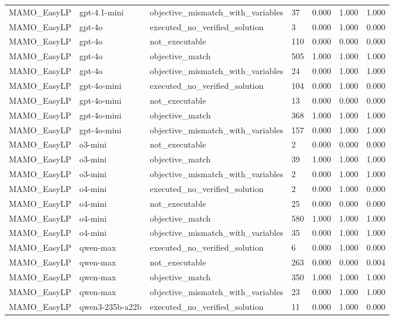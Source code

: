 \begin{table}[t]
\begin{tabular}{lllllll}
MAMO\_EasyLP & gpt-4.1-mini & objective\_mismatch\_with\_variables & 37 & 0.000 & 1.000 & 1.000 \\
MAMO\_EasyLP & gpt-4o & executed\_no\_verified\_solution & 3 & 0.000 & 1.000 & 0.000 \\
MAMO\_EasyLP & gpt-4o & not\_executable & 110 & 0.000 & 0.000 & 0.000 \\
MAMO\_EasyLP & gpt-4o & objective\_match & 505 & 1.000 & 1.000 & 1.000 \\
MAMO\_EasyLP & gpt-4o & objective\_mismatch\_with\_variables & 24 & 0.000 & 1.000 & 1.000 \\
MAMO\_EasyLP & gpt-4o-mini & executed\_no\_verified\_solution & 104 & 0.000 & 1.000 & 0.000 \\
MAMO\_EasyLP & gpt-4o-mini & not\_executable & 13 & 0.000 & 0.000 & 0.000 \\
MAMO\_EasyLP & gpt-4o-mini & objective\_match & 368 & 1.000 & 1.000 & 1.000 \\
MAMO\_EasyLP & gpt-4o-mini & objective\_mismatch\_with\_variables & 157 & 0.000 & 1.000 & 1.000 \\
MAMO\_EasyLP & o3-mini & not\_executable & 2 & 0.000 & 0.000 & 0.000 \\
MAMO\_EasyLP & o3-mini & objective\_match & 39 & 1.000 & 1.000 & 1.000 \\
MAMO\_EasyLP & o3-mini & objective\_mismatch\_with\_variables & 2 & 0.000 & 1.000 & 1.000 \\
MAMO\_EasyLP & o4-mini & executed\_no\_verified\_solution & 2 & 0.000 & 1.000 & 0.000 \\
MAMO\_EasyLP & o4-mini & not\_executable & 25 & 0.000 & 0.000 & 0.000 \\
MAMO\_EasyLP & o4-mini & objective\_match & 580 & 1.000 & 1.000 & 1.000 \\
MAMO\_EasyLP & o4-mini & objective\_mismatch\_with\_variables & 35 & 0.000 & 1.000 & 1.000 \\
MAMO\_EasyLP & qwen-max & executed\_no\_verified\_solution & 6 & 0.000 & 1.000 & 0.000 \\
MAMO\_EasyLP & qwen-max & not\_executable & 263 & 0.000 & 0.000 & 0.004 \\
MAMO\_EasyLP & qwen-max & objective\_match & 350 & 1.000 & 1.000 & 1.000 \\
MAMO\_EasyLP & qwen-max & objective\_mismatch\_with\_variables & 23 & 0.000 & 1.000 & 1.000 \\
MAMO\_EasyLP & qwen3-235b-a22b & executed\_no\_verified\_solution & 11 & 0.000 & 1.000 & 0.000 \\

\end{tabular}
\end{table}

